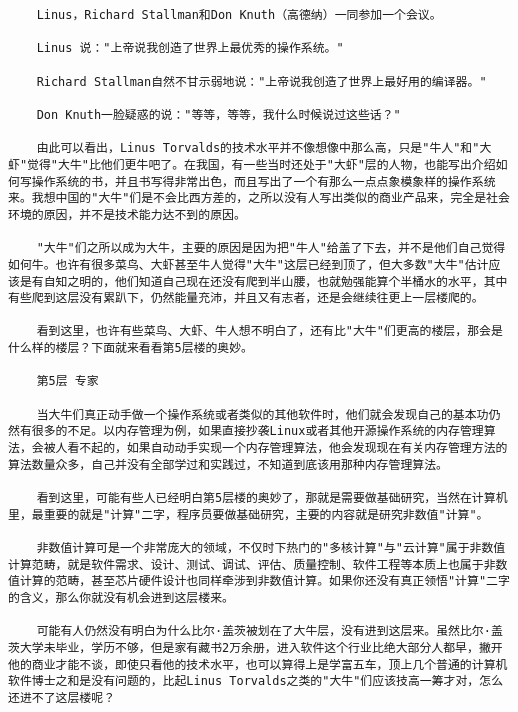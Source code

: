 \begin{verbatim}
    Linus，Richard Stallman和Don Knuth（高德纳）一同参加一个会议。

    Linus 说："上帝说我创造了世界上最优秀的操作系统。"

    Richard Stallman自然不甘示弱地说："上帝说我创造了世界上最好用的编译器。"

    Don Knuth一脸疑惑的说："等等，等等，我什么时候说过这些话？"

    由此可以看出，Linus Torvalds的技术水平并不像想像中那么高，只是"牛人"和"大虾"觉得"大牛"比他们更牛吧了。在我国，有一些当时还处于"大虾"层的人物，也能写出介绍如何写操作系统的书，并且书写得非常出色，而且写出了一个有那么一点点象模象样的操作系统来。我想中国的"大牛"们是不会比西方差的，之所以没有人写出类似的商业产品来，完全是社会环境的原因，并不是技术能力达不到的原因。

    "大牛"们之所以成为大牛，主要的原因是因为把"牛人"给盖了下去，并不是他们自己觉得如何牛。也许有很多菜鸟、大虾甚至牛人觉得"大牛"这层已经到顶了，但大多数"大牛"估计应该是有自知之明的，他们知道自己现在还没有爬到半山腰，也就勉强能算个半桶水的水平，其中有些爬到这层没有累趴下，仍然能量充沛，并且又有志者，还是会继续往更上一层楼爬的。

    看到这里，也许有些菜鸟、大虾、牛人想不明白了，还有比"大牛"们更高的楼层，那会是什么样的楼层？下面就来看看第5层楼的奥妙。

    第5层 专家

    当大牛们真正动手做一个操作系统或者类似的其他软件时，他们就会发现自己的基本功仍然有很多的不足。以内存管理为例，如果直接抄袭Linux或者其他开源操作系统的内存管理算法，会被人看不起的，如果自动动手实现一个内存管理算法，他会发现现在有关内存管理方法的算法数量众多，自己并没有全部学过和实践过，不知道到底该用那种内存管理算法。

    看到这里，可能有些人已经明白第5层楼的奥妙了，那就是需要做基础研究，当然在计算机里，最重要的就是"计算"二字，程序员要做基础研究，主要的内容就是研究非数值"计算"。

    非数值计算可是一个非常庞大的领域，不仅时下热门的"多核计算"与"云计算"属于非数值计算范畴，就是软件需求、设计、测试、调试、评估、质量控制、软件工程等本质上也属于非数值计算的范畴，甚至芯片硬件设计也同样牵涉到非数值计算。如果你还没有真正领悟"计算"二字的含义，那么你就没有机会进到这层楼来。

    可能有人仍然没有明白为什么比尔·盖茨被划在了大牛层，没有进到这层来。虽然比尔·盖茨大学未毕业，学历不够，但是家有藏书2万余册，进入软件这个行业比绝大部分人都早，撇开他的商业才能不谈，即使只看他的技术水平，也可以算得上是学富五车，顶上几个普通的计算机软件博士之和是没有问题的，比起Linus Torvalds之类的"大牛"们应该技高一筹才对，怎么还进不了这层楼呢？


\end{verbatim}

